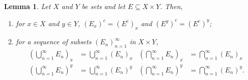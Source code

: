\documentclass[a4paper, openany]{memoir}
\theoremstyle{definition}
\theoremstyle{plain}
\newtheorem{lemma}[definition]{Lemma}
\begin{document}
    \begin{lemma}
        Let $X$ and $Y$ be sets and let $E \subseteq X \times Y$. Then, 
        \begin{enumerate}
            \item for $x \in X$ and $y \in Y$, $(E_x)^c = (E^c)_x$ and $(E^y)^c = (E^c)^y$;
            \item for a sequence of subsets $(E_n)_{n=1}^\infty$ in $X \times Y$,
            \begin{align*}
                \left(\bigcup_{n=1}^\infty E_n \right)_x &= \bigcup_{n=1}^\infty (E_n)_x & \left(\bigcap_{n=1}^\infty E_n \right)_x &= \bigcap_{n=1}^\infty (E_n)_x \\
                \left(\bigcup_{n=1}^\infty E_n \right)^y &= \bigcup_{n=1}^\infty (E_n)^y & \left(\bigcap_{n=1}^\infty E_n \right)^y &= \bigcap_{n=1}^\infty (E_n)^y.
            \end{align*}
        \end{enumerate}
    \end{lemma}
\end{document}
